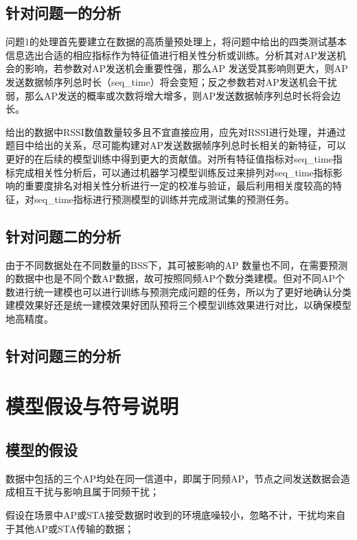 \documentclass[bwprint]{gmcmthesis}
\begin{document}
\subsection{针对问题一的分析}

问题1的处理首先要建立在数据的高质量预处理上，将问题中给出的四类测试基本信息选出合适的相应指标作为特征值进行相关性分析或训练。分析其对AP发送机会的影响，若参数对AP发送机会重要性强，那么AP 发送受其影响则更大，则AP发送数据帧序列总时长（seq\_time）将会变短；反之参数若对AP发送机会干扰弱，那么AP发送的概率或次数将增大增多，则AP发送数据帧序列总时长将会边长。

给出的数据中RSSI数值数量较多且不宜直接应用，应先对RSSI进行处理，并通过题目中给出的关系，尽可能构建对AP发送数据帧序列总时长相关的新特征，可以更好的在后续的模型训练中得到更大的贡献值。对所有特征值指标对seq\_time指标完成相关性分析后，可以通过机器学习模型训练反过来排列对seq\_time指标影响的重要度排名对相关性分析进行一定的校准与验证，最后利用相关度较高的特征，对seq\_time指标进行预测模型的训练并完成测试集的预测任务。

\subsection{针对问题二的分析}
由于不同数据处在不同数量的BSS下，其可被影响的AP 数量也不同，在需要预测的数据中也是不同个数AP数据，故可按照同频AP个数分类建模。但对不同AP个数进行统一建模也可以进行训练与预测完成问题的任务，所以为了更好地确认分类建模效果好还是统一建模效果好团队预将三个模型训练效果进行对比，以确保模型地高精度。

\subsection{针对问题三的分析}


\section{模型假设与符号说明}
\subsection{模型的假设}
\begin{assumption}
	\label{asm:1}
	数据中包括的三个AP均处在同一信道中，即属于同频AP，节点之间发送数据会造成相互干扰与影响且属于同频干扰；
\end{assumption}

\begin{assumption}
	\label{asm:2}
	假设在场景中AP或STA接受数据时收到的环境底噪较小，忽略不计，干扰均来自于其他AP或STA传输的数据；
\end{assumption}
\end{document}
